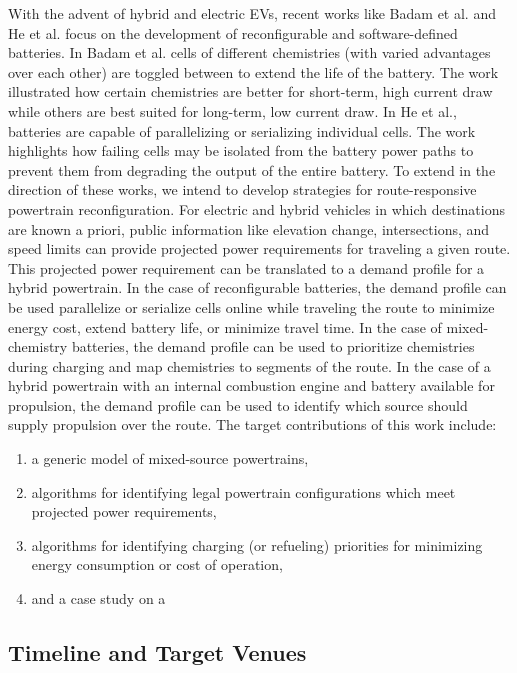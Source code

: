 With the advent of hybrid and electric EVs, recent works like Badam et al. \cite{badam_software_2015} and He et al. \cite{he_case_2017} focus on the development of reconfigurable and software-defined batteries.
In Badam et al. cells of different chemistries (with varied advantages over each other) are toggled between to extend the life of the battery.
The work illustrated how certain chemistries are better for short-term, high current draw while others are best suited for long-term, low current draw.
In He et al., batteries are capable of parallelizing or serializing individual cells.
The work highlights how failing cells may be isolated from the battery power paths to prevent them from degrading the output of the entire battery.
To extend in the direction of these works, we intend to develop strategies for route-responsive powertrain reconfiguration.
For electric and hybrid vehicles in which destinations are known a priori, public information like elevation change, intersections, and speed limits can provide projected power requirements for traveling a given route.
This projected power requirement can be translated to a demand profile for a hybrid powertrain.
In the case of reconfigurable batteries, the demand profile can be used parallelize or serialize cells online while traveling the route to minimize energy cost, extend battery life, or minimize travel time.
In the case of mixed-chemistry batteries, the demand profile can be used to prioritize chemistries during charging and map chemistries to segments of the route.
In the case of a hybrid powertrain with an internal combustion engine and battery available for propulsion, the demand profile can be used to identify which source should supply propulsion over the route.
The target contributions of this work include:
\begin{enumerate}
    \item a generic model of mixed-source powertrains,
    \item algorithms for identifying legal powertrain configurations which meet projected power requirements,
    \item algorithms for identifying charging (or refueling) priorities for minimizing energy consumption or cost of operation,
    \item and a case study on a 
\end{enumerate}

\subsection{Timeline and Target Venues}

